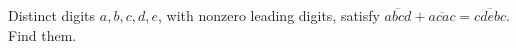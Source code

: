 Distinct digits $a,b,c,d,e$, with nonzero leading digits, satisfy $\overline{abcd}+\overline{acac}=\overline{cdebc}$. Find them.
